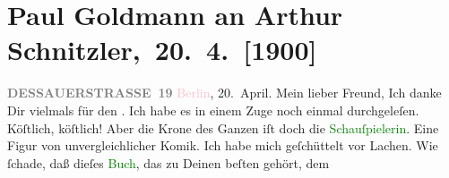 

         
         \renewcommand{\erwaehntePersonen}{Personen: Auguste Chlum}
         \renewcommand{\erwaehnteInstitutionen}{Institutionen: Wiener Verlag}
         \renewcommand{\erwaehnteOrte}{Orte: Berlin, Dessauer Straße, Kleines Schauspielhaus, Wien}
         \renewcommand{\erwaehnteWerke}{Werke: Reigen. Zehn Dialoge}
               \section[ Paul Goldmann an Arthur Schnitzler, 20. 4. {[}1900{]}]{Paul Goldmann an Arthur Schnitzler, 20. 4. {[}1900{]}}\nopagebreak{}\rehead{ }\normalsize\beginnumbering{} \toendnotes[C]{\smallbreak\pagebreak[2]} 
\toendnotes[C]{\smallbreak}\pstart
           \noindent{}{\pb}\textcolor{pink}{\textcolor{gray}{\textbf{DESSAUERSTRASSE 19}}}{}\ledrightnote{\textcolor{pink}{Dessauer Straße}}\pend
           {\bigskip}\pstart
           \raggedleft{}\textcolor{pink}{Berlin}{}\ledrightnote{\textcolor{pink}{Berlin}}, 20. April.\pend
           \pstart\center{}Mein lieber Freund,\pend\pstart
           Ich danke Dir vielmals für den \label{K_L02912-1v}\label{K_L02912-1h}. Ich habe es in einem Zuge noch einmal durchgeleſen. Köſtlich,
               köſtlich! Aber die  Krone des Ganzen iſt doch die \textcolor{green}{Schauſpielerin}{}\ledrightnote{{$\rightarrow$}\textcolor{green}{Reigen. Zehn Dialoge}}. Eine Figur von unvergleichlicher Komik. Ich
               habe mich geſchüttelt vor Lachen. Wie ſchade, daß dieſes \textcolor{green}{Buch}{}\ledrightnote{{$\rightarrow$}\textcolor{green}{Reigen. Zehn Dialoge}}, das zu Deinen beſten gehört, dem
